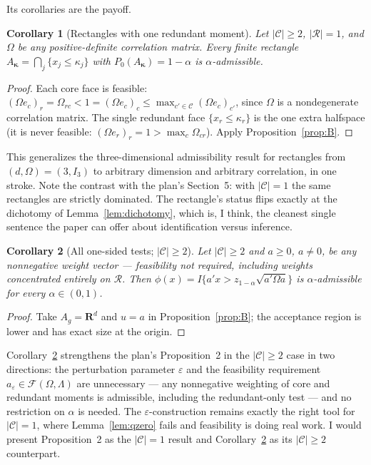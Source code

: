 \documentclass[12pt]{article}
\newtheorem{corollary}{Corollary}
\theoremstyle{remark}
\newcommand{\R}{\mathbf R}
\newcommand{\cC}{\mathcal C}
\newcommand{\cR}{\mathcal R}
\newcommand{\cF}{\mathcal F}
\begin{document}
Its corollaries are the payoff.

\begin{corollary}[Rectangles with one redundant moment]\label{cor:rect}
Let $|\cC|\ge2$, $|\cR|=1$, and $\Omega$ be any positive-definite
correlation matrix. Every finite rectangle
$A_{\bm\kappa}=\bigcap_j\{x_j\le\kappa_j\}$ with $P_0(A_{\bm\kappa})
=1-\alpha$ is $\alpha$-admissible.
\end{corollary}

\begin{proof}
Each core face is feasible: $(\Omega e_c)_r=\Omega_{rc}<1=(\Omega e_c)_c
\le\max_{c'\in\cC}(\Omega e_c)_{c'}$, since $\Omega$ is a nondegenerate
correlation matrix. The single redundant face $\{x_r\le\kappa_r\}$ is the
one extra halfspace (it is never feasible: $(\Omega e_r)_r=1>
\max_c\Omega_{cr}$). Apply Proposition~\ref{prop:B}.
\end{proof}

This generalizes the three-dimensional admissibility result for rectangles
from $(d,\Omega)=(3,I_3)$ to arbitrary dimension and arbitrary correlation,
in one stroke. Note the contrast with the plan's Section~5: with
$|\cC|=1$ the same rectangles are strictly dominated. The rectangle's
status flips exactly at the dichotomy of Lemma~\ref{lem:dichotomy}, which
is, I think, the cleanest single sentence the paper can offer about
identification versus inference.

\begin{corollary}[All one-sided tests; $|\cC|\ge2$]\label{cor:halfspace}
Let $|\cC|\ge2$ and $a\ge0$, $a\ne0$, be \emph{any} nonnegative weight
vector --- feasibility not required, including weights concentrated
entirely on $\cR$. Then
$\phi(x)=I\{a'x>z_{1-\alpha}\sqrt{a'\Omega a}\}$ is $\alpha$-admissible
for every $\alpha\in(0,1)$.
\end{corollary}

\begin{proof}
Take $A_g=\R^d$ and $u=a$ in Proposition~\ref{prop:B}; the acceptance
region is lower and has exact size at the origin.
\end{proof}

Corollary~\ref{cor:halfspace} strengthens the plan's Proposition~2 in the
$|\cC|\ge2$ case in two directions: the perturbation parameter
$\varepsilon$ and the feasibility requirement $a_\varepsilon\in
\cF(\Omega,\Lambda)$ are unnecessary --- any nonnegative weighting of core
and redundant moments is admissible, including the redundant-only test ---
and no restriction on $\alpha$ is needed. The $\varepsilon$-construction
remains exactly the right tool for $|\cC|=1$, where
Lemma~\ref{lem:qzero} fails and feasibility is doing real work. I would
present Proposition~2 as the $|\cC|=1$ result and
Corollary~\ref{cor:halfspace} as its $|\cC|\ge2$ counterpart.
\end{document}
